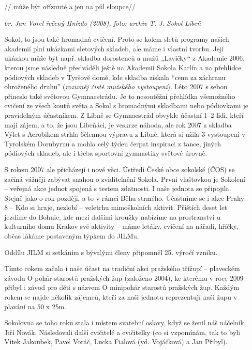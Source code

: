 // může být oříznuté a jen na půl sloupce//

\emph{br. Jan Vorel řečený Hnízdo (2008), foto: archiv T. J. Sokol
Libeň}

Sokol, to jsou také hromadná cvičení. Proto se kolem sletů programy
našich akademií plní ukázkami sletových skladeb, ale máme i vlastní
tvorbu. Její ukázkou může být např. skladba dorostenců a mužů „Lavičky``
z Akademie 2006, kterou jsme následně předváděli ještě na Akademii
Sokola Karlín a na přehlídce pódiových skladeb v Tyršově domě, kde
skladba získala ``cenu za záchranu ohroženého druhu'' (\emph{rozuměj
čistě mužského vystoupení}). Léto 2007 s sebou přineslo také světovou
Gymnaestrádu. Je to nesoutěžní přehlídka všemožného cvičení ze všech
koutů světa a Sokol s hromadnými skladbami nebo pódiovkami je
pravidelným účastníkem. Z Libně se Gymnaestrád obvykle účastní 1--2
lidi, kteří mají zájem, a to, že jsou Libeňáci, je veskrze náhoda, ale
rok 2007 a skladba Výlet s Aerobikem strhla 6člennou výpravu z Libně,
která si užila 3 vystoupení v Tyrolském Dornbyrnu a mohla celý týden
čerpat inspiraci z tance, jiných pódiových skladeb, ale i třeba
sportovní gymnastiky světové úrovně.

S rokem 2007 ale přicházejí i nové věci. Ústředí České obce sokolské
(ČOS) se začíná vážněji zabývat snahou o zviditelnění Sokola. První
vlaštovkou je Sokolení -- veřejná akce jednot spojená s testem
zdatnosti. I naše jednota se připojila. Stejně jako o rok později, a to
v rámci Běhu strmého. Účastníme se i akce Prahy 8 -- Kdo si hraje,
nezlobí -- veletrhu mimoškolních aktivit. Příštích deset let jezdíme do
Bohnic, kde mezi dalšími kroužky nabízíme na prostranství u kulturního
domu Krakov své aktivity -- máme letáky, cvičení na nářadí, hříčky,
občas lákáme postaveným týpkem do JILMu.

Oddílu JILM si setkáním s bývalými členy připomněl 25. výročí vzniku.

Tímto rokem začala i naše účast na tradiční akci pražského třížupí --
plaveckém závodu O pohár starostů pražských žup (založeno 2004), ke
kterému v roce 2009 přibyl i závod pro děti s názvem O minipohár
starostů pražských žup. Každým rokem se najde několik zájemců, kteří za
naši jednotu reprezentují naši župu v plavání na 50 x 25m.

Sokolovna se toho roku stala i místem svatební oslavy, když se ženil náš
náčelník Jiří Novák. Následovali další cvičitelé a cvičitelky (co si
vzpomínám, tak to byli Vítek Jakoubek, Pavel Voráč, Lucka Fialová (vd.
Vojáčková) a Jan Přibyl).


